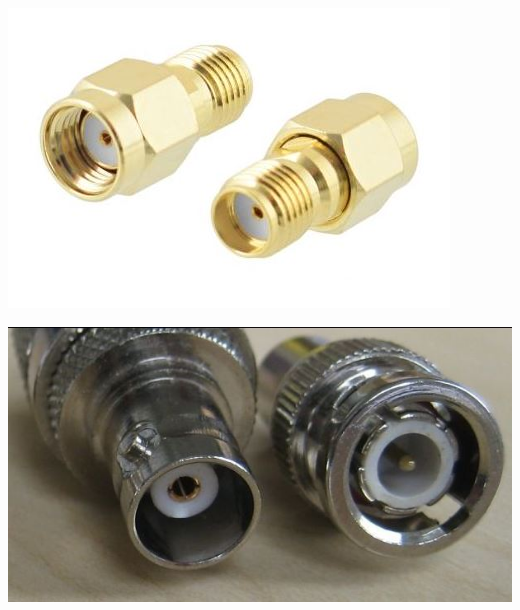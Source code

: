 \documentclass{protokol}
\begin{document}
\begin{center}
	\captionsetup{justification=centering}
	\begin{minipage}{0.32\textwidth}
		\includegraphics[width=\textwidth]{connector-sma}
		\label{SMA}
	\end{minipage}
	\begin{minipage}{0.40\linewidth}
		\includegraphics[width=\linewidth]{connector-bnc}
		\label{BNC}
	\end{minipage}
	\begin{minipage}{0.29\textwidth}

\end{minipage}
\end{center}
\end{document}
